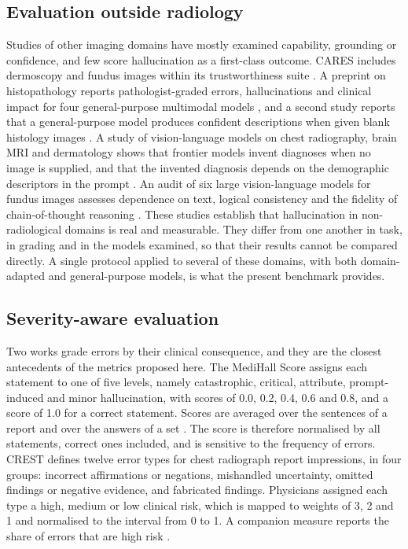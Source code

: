\subsection{Evaluation outside radiology}
\label{subsec:rw_nonrad}

Studies of other imaging domains have mostly examined capability, grounding or confidence, and few score hallucination as a first-class outcome. CARES includes dermoscopy and fundus images within its trustworthiness suite \citep{xia2024cares}. A preprint on histopathology reports pathologist-graded errors, hallucinations and clinical impact for four general-purpose multimodal models \citep{lami2026histopathology}, and a second study reports that a general-purpose model produces confident descriptions when given blank histology images \citep{hasan2026seeing}. A study of vision-language models on chest radiography, brain MRI and dermatology shows that frontier models invent diagnoses when no image is supplied, and that the invented diagnosis depends on the demographic descriptors in the prompt \citep{vohra2026hearsay}. An audit of six large vision-language models for fundus images assesses dependence on text, logical consistency and the fidelity of chain-of-thought reasoning \citep{zhang2026fundus}. These studies establish that hallucination in non-radiological domains is real and measurable. They differ from one another in task, in grading and in the models examined, so that their results cannot be compared directly. A single protocol applied to several of these domains, with both domain-adapted and general-purpose models, is what the present benchmark provides.

\subsection{Severity-aware evaluation}
\label{subsec:rw_severity}

Two works grade errors by their clinical consequence, and they are the closest antecedents of the metrics proposed here. The MediHall Score assigns each statement to one of five levels, namely catastrophic, critical, attribute, prompt-induced and minor hallucination, with scores of 0.0, 0.2, 0.4, 0.6 and 0.8, and a score of 1.0 for a correct statement. Scores are averaged over the sentences of a report and over the answers of a set \citep{chen2024medhallmark}. The score is therefore normalised by all statements, correct ones included, and is sensitive to the frequency of errors. CREST defines twelve error types for chest radiograph report impressions, in four groups: incorrect affirmations or negations, mishandled uncertainty, omitted findings or negative evidence, and fabricated findings. Physicians assigned each type a high, medium or low clinical risk, which is mapped to weights of 3, 2 and 1 and normalised to the interval from 0 to 1. A companion measure reports the share of errors that are high risk \citep{crest2025medrxiv}.


